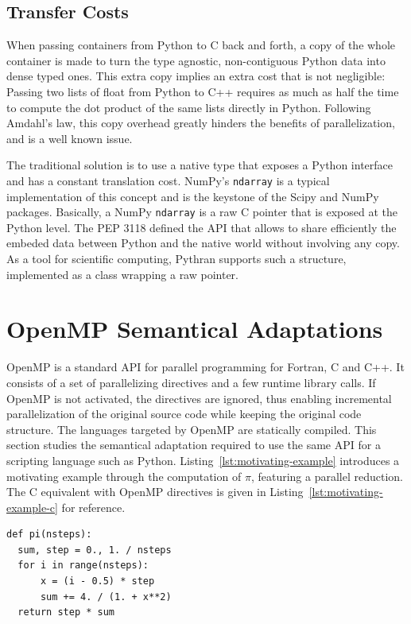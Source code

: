 \documentclass[conference]{IEEEtran}
\begin{document}
\subsection{Transfer Costs}

When passing containers from Python to C back and forth, a copy of the whole
container is made to turn the type agnostic, non-contiguous Python data into
dense typed ones. This extra copy implies an extra cost that is not negligible:
Passing two lists of float from Python to C++ requires as much as half the time
to compute the dot product of the same lists directly in Python. Following
Amdahl's law, this copy overhead greatly hinders the benefits of
parallelization, and is a well known issue.

The traditional solution is to use a native type that exposes a Python interface
and has a constant translation cost. NumPy's \texttt{ndarray} is a typical
implementation of this concept and is the keystone of the Scipy and NumPy
packages. Basically, a NumPy \texttt{ndarray} is a raw C pointer that is exposed
at the Python level. The PEP 3118 defined the API that allows to share
efficiently the embeded data between Python and the native world without
involving any copy. As a tool for scientific computing, Pythran supports such a
structure, implemented as a class wrapping a raw pointer.


\section{OpenMP Semantical Adaptations}\label{sec:python-openmp}

OpenMP is a standard API for parallel programming for Fortran, C and C++. It
consists of a set of parallelizing directives and a few runtime library calls.
If OpenMP is not activated, the directives are ignored, thus enabling
incremental parallelization of the original source code while keeping the
original code structure. The languages targeted by OpenMP are statically
compiled. This section studies the semantical adaptation required to use the
same API for a scripting language such as Python.
Listing~\ref{lst:motivating-example} introduces a motivating example through the
computation of $\pi$, featuring a parallel reduction. The C equivalent with
OpenMP directives is given in Listing~\ref{lst:motivating-example-c} for
reference.

\begin{lstlisting}[float, label={lst:motivating-example}, caption={Motivating
example: computing $\pi$ in Python.}]
def pi(nsteps):
  sum, step = 0., 1. / nsteps
  for i in range(nsteps):
      x = (i - 0.5) * step
      sum += 4. / (1. + x**2)
  return step * sum
\end{lstlisting}
\end{document}
